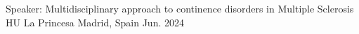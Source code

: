 

\begin{cventries}

  \cventry
    {Speaker: Multidisciplinary approach to continence disorders in Multiple Sclerosis} %
    {HU La Princesa} %
    {Madrid, Spain} %
    {Jun. 2024} %
    {}

\end{cventries}
